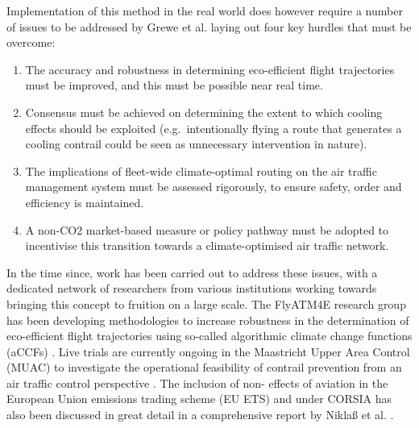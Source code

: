 Implementation of this method in the real world does however require a number of issues to be addressed by Grewe et al. \cite{Grewe2017} laying out four key hurdles that must be overcome: 

\begin{enumerate}
	\item The accuracy and robustness in determining eco-efficient flight trajectories must be improved, and this must be possible near real time.
	\item Consensus must be achieved on determining the extent to which cooling effects should be exploited (e.g.\ intentionally flying a route that generates a cooling contrail could be seen as unnecessary intervention in nature).
	\item The implications of fleet-wide climate-optimal routing on the air traffic management system must be assessed rigorously, to ensure safety, order and efficiency is maintained.
	\item A non-CO2 market-based measure or policy pathway must be adopted to incentivise this transition towards a climate-optimised air traffic network.
\end{enumerate}

In the time since, work has been carried out to address these issues, with a dedicated network of researchers from various institutions working towards bringing this concept to fruition on a large scale. The FlyATM4E research group has been developing methodologies to increase robustness in the determination of eco-efficient flight trajectories using so-called algorithmic climate change functions (aCCFs) \cite{Matthes2020}. Live trials are currently ongoing in the Maastricht Upper Area Control (MUAC) to investigate the operational feasibility of contrail prevention from an air traffic control perspective \cite{MUAC}. The inclusion of non- effects of aviation in the European Union emissions trading scheme (EU ETS) and under CORSIA has also been discussed in great detail in a comprehensive report by Nikla{\ss} et al. \cite{Niklass2019}.




